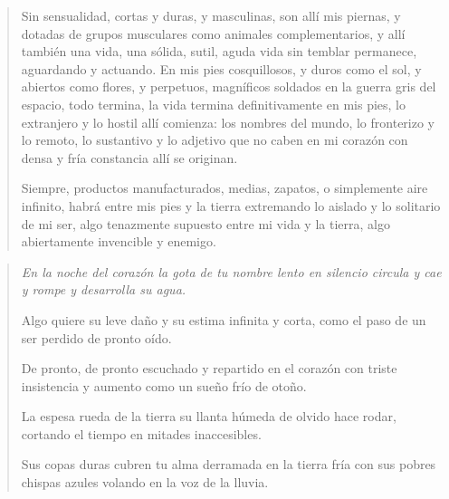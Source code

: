 \documentclass[12pt]{article}
\begin{document}
\begin{verse}
Sin sensualidad, cortas y duras, y masculinas,  
son allí mis piernas, y dotadas  
de grupos musculares como animales complementarios,  
y allí también una vida, una sólida, sutil, aguda vida  
sin temblar permanece, aguardando y actuando.  
En mis pies cosquillosos,  
y duros como el sol, y abiertos como flores,  
y perpetuos, magníficos soldados  
en la guerra gris del espacio,  
todo termina, la vida termina definitivamente en mis pies,  
lo extranjero y lo hostil allí comienza:  
los nombres del mundo, lo fronterizo y lo remoto,  
lo sustantivo y lo adjetivo que no caben en mi corazón  
con densa y fría constancia allí se originan.  
	
Siempre,  
productos manufacturados, medias, zapatos,  
o simplemente aire infinito,  
habrá entre mis pies y la tierra  
extremando lo aislado y lo solitario de mi ser,  
algo tenazmente supuesto entre mi vida y la tierra,  
algo abiertamente invencible y enemigo.

\end{verse}

\clearpage
{}
\begin{verse}
\itshape
En la noche del corazón  
la gota de tu nombre lento  
en silencio circula y cae  
y rompe y desarrolla su agua.  
	
Algo quiere su leve daño  
y su estima infinita y corta,  
como el paso de un ser perdido  
de pronto oído.  
	
De pronto, de pronto escuchado  
y repartido en el corazón  
con triste insistencia y aumento  
como un sueño frío de otoño.  
	
La espesa rueda de la tierra  
su llanta húmeda de olvido  
hace rodar, cortando el tiempo  
en mitades inaccesibles.  
	
Sus copas duras cubren tu alma  
derramada en la tierra fría  
con sus pobres chispas azules  
volando en la voz de la lluvia.
\end{verse}
\end{document}
